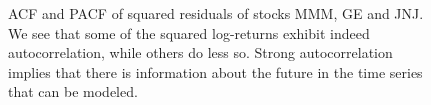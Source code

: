 \begin{figure}[H]
    \centering
    \begin{adjustbox}{width=.95\textwidth,center}
    
    \end{adjustbox}
    \begin{adjustbox}{width=.95\textwidth,center}
    
    \end{adjustbox}  
    \begin{adjustbox}{width=.95\textwidth,center}
    
    \end{adjustbox}  
    \caption{ACF and PACF of squared residuals of stocks MMM, GE and JNJ. We see that some of the squared log-returns exhibit indeed autocorrelation, while others do less so. Strong autocorrelation implies that there is information about the future in the time series that can be modeled.}
    \label{fig:ACF_selected_squared_log_returns}
\end{figure}{}

